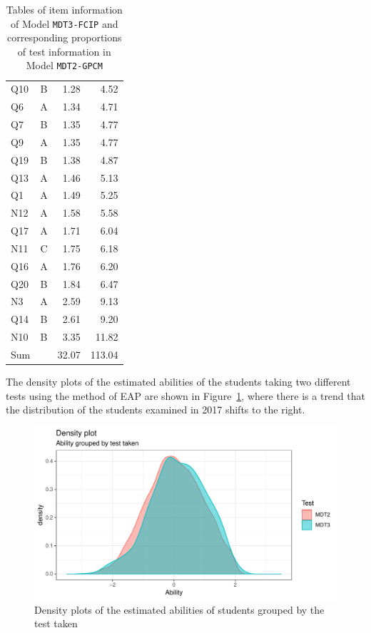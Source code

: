 \documentclass[a4paper]{report}
\begin{document}
\begin{table}[ht]
\begin{minipage}{0.5\linewidth}
\begin{tabular}{lcrr}
      Q10 & B & 1.28 & 4.52 \\ 
      Q6 & A & 1.34 & 4.71 \\ 
      Q7 & B & 1.35 & 4.77 \\ 
      Q9 & A & 1.35 & 4.77 \\ 
      Q19 & B & 1.38 & 4.87 \\ 
      Q13 & A & 1.46 & 5.13 \\ 
      Q1 & A & 1.49 & 5.25 \\ 
      N12 & A & 1.58 & 5.58 \\ 
      Q17 & A & 1.71 & 6.04 \\ 
      N11 & C & 1.75 & 6.18 \\ 
      Q16 & A & 1.76 & 6.20 \\ 
      Q20 & B & 1.84 & 6.47 \\ 
      N3 & A & 2.59 & 9.13 \\ 
      Q14 & B & 2.61 & 9.20 \\ 
      N10 & B & 3.35 & 11.82 \\ 
      \hline
      Sum & & 32.07 & 113.04 \\
       \hline
    \end{tabular}
  \end{minipage}
  \caption{\label{tab:IMPRV_FCIP_info}Tables of item information of Model \texttt{MDT3-FCIP} and corresponding proportions of test information in Model \texttt{MDT2-GPCM}}
\end{table}

The density plots of the estimated abilities of the students taking two different tests using the method of EAP are shown in Figure~\ref{fig:IMPRV_FCIP_eap}, where there is a trend that the distribution of the students examined in 2017 shifts to the right. 

\begin{figure}[H]
  \centering
  \includegraphics[width=\linewidth]{fig/IMPRV_FCIP_eap.pdf}
  \caption{\label{fig:IMPRV_FCIP_eap}Density plots of the estimated abilities of students grouped by the test taken}
\end{figure}
\end{document}
